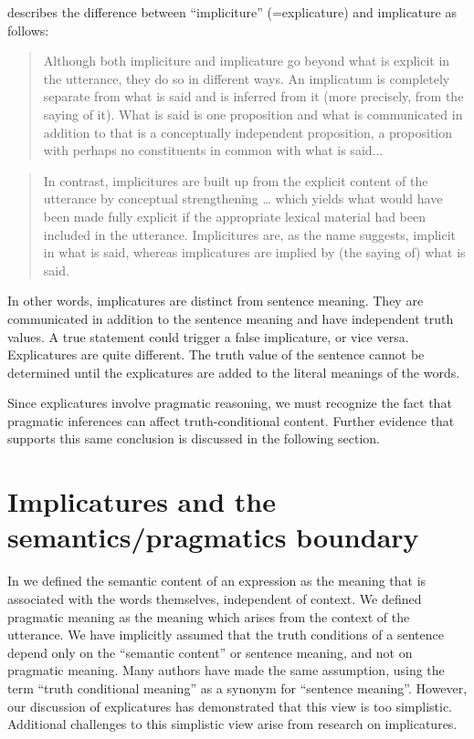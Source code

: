 \citet[11]{Bach1994} describes the difference between “impliciture” (=explicature) and implicature as follows:


\begin{quote}
Although both impliciture and implicature go beyond what is explicit in the utterance, they do so in different ways. An implicatum is completely separate from what is said and is inferred from it (more precisely, from the saying of it). What is said is one proposition and what is communicated in addition to that is a conceptually independent proposition, a proposition with perhaps no constituents in common with what is said... 
\end{quote}

\begin{quote}
In contrast, implicitures are built up from the explicit content of the utterance by conceptual strengthening … which yields what would have been made fully explicit if the appropriate lexical material had been included in the utterance. Implicitures are, as the name suggests, implicit in what is said, whereas implicatures are implied by (the saying of) what is said. 
\end{quote}


In other words, implicatures are distinct from sentence meaning. They are communicated in addition to the sentence meaning and have independent truth values. A true statement could trigger a false implicature, or vice versa. Explicatures are quite different. The truth value of the sentence cannot be determined until the explicatures are added to the literal meanings of the words.



Since explicatures involve pragmatic reasoning, we must recognize the fact that pragmatic inferences can affect truth-conditional content. Further evidence that supports this same conclusion is discussed in the following section.


\section{Implicatures and the semantics/pragmatics boundary}\label{sec:9.4}

In  we defined the semantic content of an expression as the meaning that is associated with the words themselves, independent of context. We defined pragmatic meaning as the meaning which arises from the context of the utterance. We have implicitly assumed that the truth conditions of a sentence depend only on the “semantic content” or sentence meaning, and not on pragmatic meaning. Many authors have made the same assumption, using the term “truth conditional meaning” as a synonym for “sentence meaning”. However, our discussion of explicatures has demonstrated that this view is too simplistic. Additional challenges to this simplistic view arise from research on implicatures.



